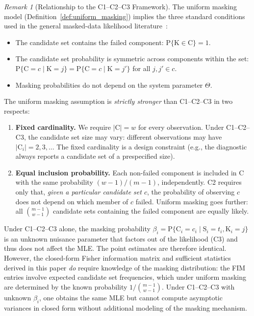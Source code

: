 \documentclass[12pt]{article}
\newcommand{\RV}[1]{\mathrm{#1}}
\newcommand{\Prob}[1]{\mathrm{P}\{#1\}}
\newcommand{\sv}{\RV{S}}           %
\newcommand{\cand}{\RV{C}}         %
\newcommand{\sysparam}{\Theta}
\theoremstyle{definition}
\theoremstyle{remark}
\newtheorem{remark}[theorem]{Remark}
\begin{document}
\begin{remark}[Relationship to the C1--C2--C3 Framework]
\label{rem:c1c2c3_comparison}
The uniform masking model (Definition~\ref{def:uniform_masking}) implies the three standard conditions used in the general masked-data likelihood literature~\cite{towell2025masked}:
\begin{itemize}
\item[\textbf{C1.}] The candidate set contains the failed component: $\Prob{\RV{K} \in \cand} = 1$.
\item[\textbf{C2.}] The candidate set probability is symmetric across components within the set: $\Prob{\cand = c \mid \RV{K} = j} = \Prob{\cand = c \mid \RV{K} = j'}$ for all $j, j' \in c$.
\item[\textbf{C3.}] Masking probabilities do not depend on the system parameter $\sysparam$.
\end{itemize}

\noindent The uniform masking assumption is \emph{strictly stronger} than C1--C2--C3 in two respects:
\begin{enumerate}
\item \textbf{Fixed cardinality.} We require $|\cand| = w$ for every observation.  Under C1--C2--C3, the candidate set size may vary: different observations may have $|\cand_i| = 2, 3, \ldots$ The fixed cardinality is a design constraint (e.g., the diagnostic always reports a candidate set of a prespecified size).

\item \textbf{Equal inclusion probability.} Each non-failed component is included in $\cand$ with the same probability $(w-1)/(m-1)$, independently.  C2 requires only that, \emph{given a particular candidate set $c$}, the probability of observing $c$ does not depend on which member of $c$ failed.  Uniform masking goes further: all $\binom{m-1}{w-1}$ candidate sets containing the failed component are equally likely.
\end{enumerate}

\noindent Under C1--C2--C3 alone, the masking probability $\beta_i = \Prob{\cand_i = c_i \mid \sv_i = t_i, \RV{K}_i = j}$ is an unknown nuisance parameter that factors out of the likelihood (C3) and thus does not affect the MLE.  The point estimates are therefore identical.  However, the closed-form Fisher information matrix and sufficient statistics derived in this paper \emph{do} require knowledge of the masking distribution: the FIM entries involve expected candidate set frequencies, which under uniform masking are determined by the known probability $1/\binom{m-1}{w-1}$.  Under C1--C2--C3 with unknown $\beta_i$, one obtains the same MLE but cannot compute asymptotic variances in closed form without additional modeling of the masking mechanism.


\end{remark}
\end{document}
